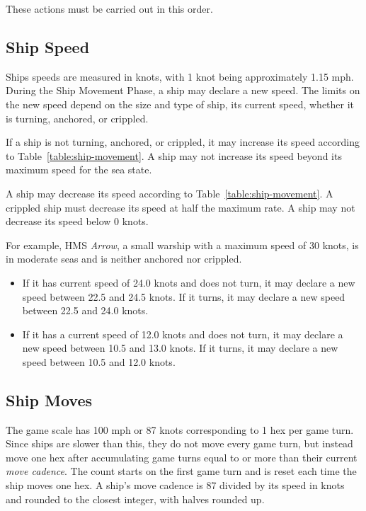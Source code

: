 {\begin{enumerate}
    \end{enumerate}
    These actions must be carried out in this order.

    

    \subsection{Ship Speed}

    Ships speeds are measured in knots, with 1 knot being approximately 1.15 mph. During the Ship Movement Phase, a ship may declare a new speed. The limits on the new speed depend on the size and type of ship, its current speed, whether it is turning, anchored, or crippled.

    If a ship is not turning, anchored, or crippled, it may increase its speed according to Table~\ref{table:ship-movement}. A ship may not increase its speed beyond its maximum speed for the sea state.

    A ship may decrease its speed according to Table~\ref{table:ship-movement}. A crippled ship must decrease its speed at half the maximum rate. A ship may not decrease its speed below 0 knots.

    For example, HMS {\itshape Arrow}, a small warship with a maximum speed of 30 knots, is in moderate seas and is neither anchored nor crippled.
    \begin{itemize}

        \item If it has current speed of 24.0 knots and does not turn, it may declare a new speed between 22.5 and 24.5 knots. If it turns, it may declare a new speed between 22.5 and 24.0 knots.

        \item If it has a current speed of 12.0 knots and does not turn, it may declare a new speed between 10.5 and 13.0 knots. If it turns, it may declare a new speed between 10.5 and 12.0 knots.

    \end{itemize}

    \subsection{Ship Moves}

    The game scale has 100 mph or 87 knots corresponding to 1 hex per game turn. Since ships are slower than this, they do not move every game turn, but instead move one hex after accumulating game turns equal to or more than their current \emph{move cadence}. The count starts on the first game turn and is reset each time the ship moves one hex. A ship's move cadence is 87 divided by its speed in knots and rounded to the closest integer, with halves rounded up.

}
